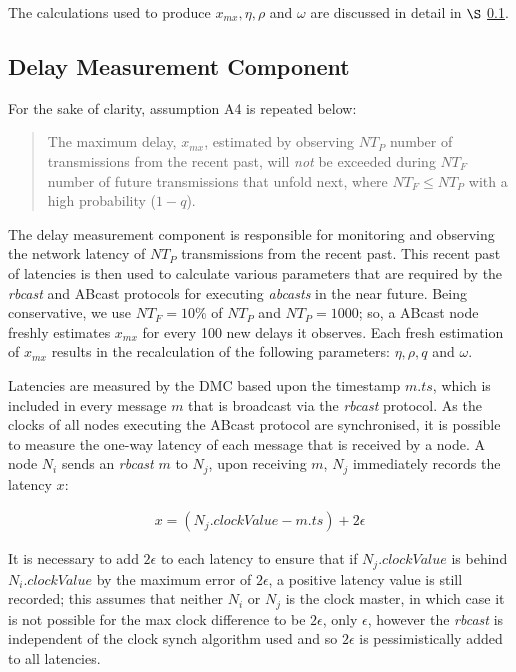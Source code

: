     The calculations used to produce $x_{mx}, \eta, \rho$ and $\omega$ are discussed in detail in $\S$ \ref{ssec:dmc}.  
    
	\subsection{Delay Measurement Component}\label{ssec:dmc}
        For the sake of clarity, assumption A4 is repeated below:	
        
        \begin{quotation}
            The maximum delay, $x_{mx}$, estimated by observing $NT_P$ number of transmissions from the recent past, will \emph{not} be exceeded during $NT_F$ number of future transmissions that unfold next, where $NT_F \leq NT_P$ with a high probability ($1 - q$).
        \end{quotation}
	
        The delay measurement component is responsible for monitoring and observing the network latency of $NT_P$ transmissions from the recent past.  This recent past of latencies is then used to calculate various parameters that are required by the \emph{rbcast} and \textsf{ABcast} protocols for executing \emph{abcasts} in the near future.  Being conservative, we use $NT_F = 10\%$ of $NT_P$ and $NT_P=1000$; so, a \textsf{ABcast} node freshly estimates $x_{mx}$ for every 100 new delays it observes.  Each fresh estimation of $x_{mx}$ results in the recalculation of the following parameters: $\eta, \rho, q$ and $\omega$.  
        
        Latencies are measured by the DMC based upon the timestamp $m.ts$, which is included in every message $m$ that is broadcast via the \emph{rbcast} protocol.  As the clocks of all nodes executing the \textsf{ABcast} protocol are synchronised, it is possible to measure the one-way latency of each message that is received by a node.  A node $N_i$ sends an \emph{rbcast} $m$ to $N_j$, upon receiving $m$, $N_j$ immediately records the latency $x$:

        \begin{equation*}
		     \begin{aligned}
		         x = (N_j.clockValue - m.ts) + 2\epsilon
		     \end{aligned}
        \end{equation*}        
        
        It is necessary to add $2\epsilon$ to each latency to ensure that if $N_j.clockValue$ is behind $N_i.clockValue$ by the maximum error of $2\epsilon$, a positive latency value is still recorded; this assumes that neither $N_i$ or $N_j$ is the clock master, in which case it is not possible for the max clock difference to be $2\epsilon$, only $\epsilon$, however the \emph{rbcast} is independent of the clock synch algorithm used and so $2\epsilon$ is pessimistically added to all latencies.  
                                
